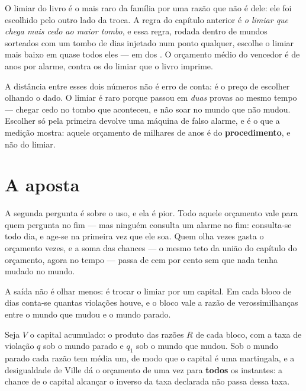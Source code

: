 O limiar do livro é o mais raro da família por uma razão que não é dele: ele foi escolhido pelo
outro lado da troca. A regra do capítulo anterior é \emph{o limiar que chega mais cedo ao maior
tombo}, e essa regra, rodada dentro de \numApostaMundosTombo{} mundos sorteados com um tombo de
\numApostaTomboDias{} dias injetado num ponto qualquer, escolhe o limiar mais baixo em quase todos
eles --- em \numApostaVencedorOito{} dos \numApostaMundosTombo{}. O orçamento médio do vencedor é de
\numApostaOrcamentoVencedor{} anos por alarme, contra os \numApostaOrcamentoEscolhido{} do limiar
que o livro imprime.

A distância entre esses dois números não é erro de conta: é o preço de escolher olhando o dado. O
limiar \numVigiaLimiar{} é raro porque passou em \emph{duas} provas ao mesmo tempo --- chegar cedo
no tombo que aconteceu, e não soar no mundo que não mudou. Escolher só pela primeira devolve uma
máquina de falso alarme, e é o que a medição mostra: aquele orçamento de milhares de anos é do
\textbf{procedimento}, e não do limiar.

\section{A aposta}

A segunda pergunta é sobre o uso, e ela é pior. Todo aquele orçamento vale para quem pergunta no fim
--- mas ninguém consulta um alarme no fim: consulta-se todo dia, e age-se na primeira vez que ele
soa. Quem olha \numApostaBlocos{} vezes gasta o orçamento \numApostaBlocos{} vezes, e a soma das
chances --- o mesmo teto da união do capítulo do orçamento, agora no tempo --- passa de cem por cento
sem que nada tenha mudado no mundo.

A saída não é olhar menos: é trocar o limiar por um capital. Em cada bloco de \numBlocoDias{} dias
conta-se quantas violações houve, e o bloco vale a razão de verossimilhanças entre o mundo que mudou
e o mundo parado.

\begin{proposicao}\label{prop:aposta}
Seja $V$ o capital acumulado: o produto das razões $R$ de cada bloco, com a taxa de violação $q$ sob
o mundo parado e $q_1$ sob o mundo que mudou. Sob o mundo parado cada razão tem média um, de modo que
o capital é uma martingala, e a desigualdade de Ville dá o orçamento de uma vez para \textbf{todos}
os instantes: a chance de o capital alcançar o inverso da taxa declarada não passa dessa taxa.
\end{proposicao}

